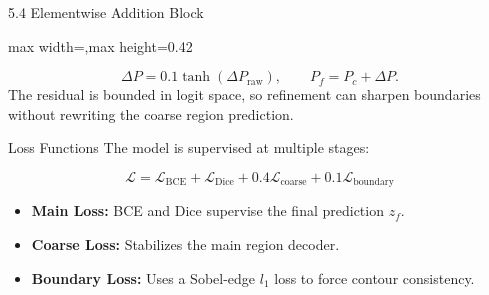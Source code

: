 \begin{frame}{5.4 Elementwise Addition Block}
    \centering
    \begin{adjustbox}{max width=\textwidth,max height=0.42\textheight}
    \end{adjustbox}

    \vspace{0.4em}
    \small
    \[
    \Delta P=0.1\tanh(\Delta P_{\mathrm{raw}}),\qquad
    P_f=P_c+\Delta P.
    \]
    \scriptsize The residual is bounded in logit space, so refinement can sharpen boundaries without rewriting the coarse region prediction.
\end{frame}

\begin{frame}{Loss Functions}
    The model is supervised at multiple stages:
    
    $$ \mathcal{L} = \mathcal{L}_{\text{BCE}} + \mathcal{L}_{\text{Dice}} + 0.4\mathcal{L}_{\text{coarse}} + 0.1\mathcal{L}_{\text{boundary}} $$
    
    \begin{itemize}
        \item \textbf{Main Loss:} BCE and Dice supervise the final prediction $z_f$.
        \item \textbf{Coarse Loss:} Stabilizes the main region decoder.
        \item \textbf{Boundary Loss:} Uses a Sobel-edge $l_1$ loss to force contour consistency.
    \end{itemize}
\end{frame}
